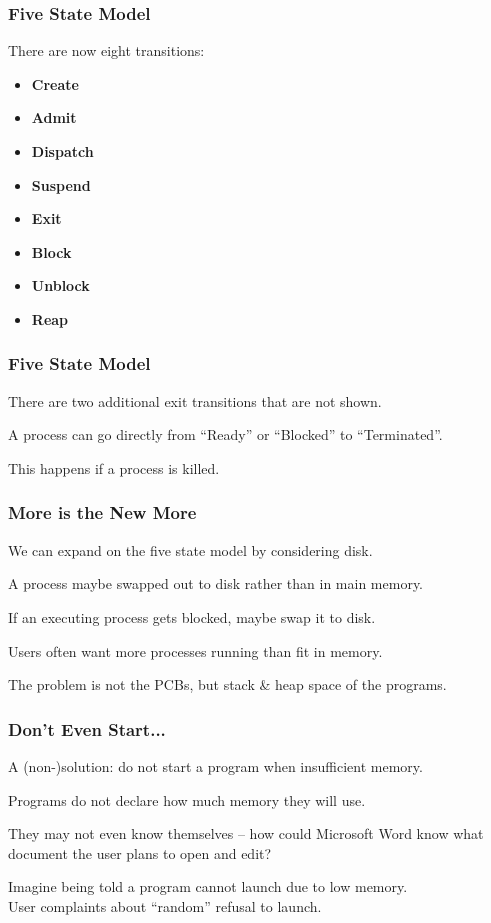 \begin{frame}
\frametitle{Five State Model}

There are now eight transitions:

\begin{itemize}
	\item \textbf{Create}
	\item \textbf{Admit}
	\item \textbf{Dispatch}
	\item \textbf{Suspend}
	\item \textbf{Exit}
	\item \textbf{Block}
	\item \textbf{Unblock}
	\item \textbf{Reap}
\end{itemize}

\end{frame}

\begin{frame}
\frametitle{Five State Model}

There are two additional exit transitions that are not shown.

A process can go directly from ``Ready'' or ``Blocked'' to ``Terminated''.

This happens if a process is killed.


\end{frame}

\begin{frame}
\frametitle{More is the New More}

We can expand on the five state model by considering disk.

A process maybe swapped out to disk rather than in main memory.

If an executing process gets blocked, maybe swap it to disk.

Users often want more processes running than fit in memory.

The problem is not the PCBs, but stack \& heap space of the programs.

\end{frame}

\begin{frame}
\frametitle{Don't Even Start...}

A (non-)solution: do not start a program when insufficient memory.

Programs do not declare how much memory they will use.

They may not even know themselves -- how could Microsoft Word know what document the user plans to open and edit?

Imagine being told a program cannot launch due to low memory.\\
\quad User complaints about ``random'' refusal to launch.

\end{frame}

